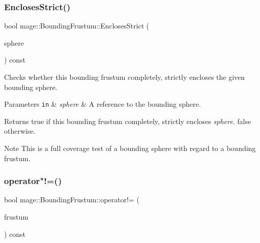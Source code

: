 \subsubsection{\texorpdfstring{Encloses\+Strict()}{EnclosesStrict()}\hspace{0.1cm}{\footnotesize\ttfamily [4/4]}}
{\footnotesize\ttfamily bool mage\+::\+Bounding\+Frustum\+::\+Encloses\+Strict (\begin{DoxyParamCaption}\item[{const \mbox{\hyperlink{classmage_1_1_bounding_sphere}{Bounding\+Sphere}} \&}]{sphere }\end{DoxyParamCaption}) const\hspace{0.3cm}{\ttfamily [noexcept]}}

Checks whether this bounding frustum completely, strictly encloses the given bounding sphere.


\begin{DoxyParams}[1]{Parameters}
\mbox{\tt in}  & {\em sphere} & A reference to the bounding sphere. \\
\hline
\end{DoxyParams}
\begin{DoxyReturn}{Returns}
{\ttfamily true} if this bounding frustum completely, strictly encloses {\itshape sphere}. {\ttfamily false} otherwise. 
\end{DoxyReturn}
\begin{DoxyNote}{Note}
This is a full coverage test of a bounding sphere with regard to a bounding frustum. 
\end{DoxyNote}
\mbox{\label{classmage_1_1_bounding_frustum_a20c545cb807db2dc2fad018229f69c2c}} 
\subsubsection{\texorpdfstring{operator"!=()}{operator!=()}}
{\footnotesize\ttfamily bool mage\+::\+Bounding\+Frustum\+::operator!= (\begin{DoxyParamCaption}\item[{const \mbox{\hyperlink{classmage_1_1_bounding_frustum}{Bounding\+Frustum}} \&}]{frustum }\end{DoxyParamCaption}) const\hspace{0.3cm}{\ttfamily [noexcept]}}

